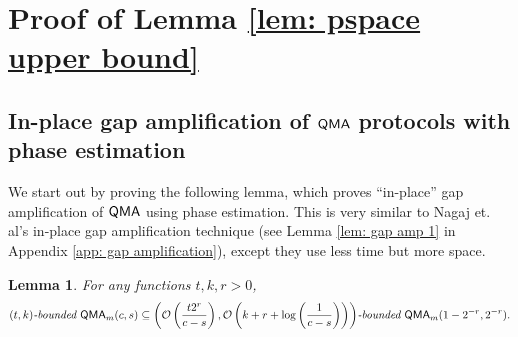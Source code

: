 \documentclass[11pt]{article}
\newtheorem{lemma}[theorem]{Lemma}
\theoremstyle{definition}
\theoremstyle{remark}
\newcommand\QMA{{\sf{QMA}}}
\newcommand\bddQMA[5]{{\left(#1,#2\right)}\textit{-bounded }\QMA_{#3}(#4,#5)}
\begin{document}
\section{Proof of Lemma \ref{lem: pspace upper bound}} \label{app: pspace upper bound}
\subsection{In-place gap amplification of $\QMA$ protocols with phase estimation}\label{app: space efficient amplification}

We start out by proving the following lemma, which proves ``in-place'' gap amplification of $\QMA$ using phase estimation.
This is very similar to Nagaj et. al's in-place gap amplification technique \cite{nwz11} (see Lemma \ref{lem: gap amp 1} in Appendix \ref{app: gap amplification}), except they use less time but more space.
\begin{lemma} \label{lem: gap amp 2}
For any functions $t,k,r>0$, 
\[
\bddQMA{t}{k}{m}{c}{s}\subseteq\bddQMA{\mathcal{O}\left(\frac{t2^r}{c-s}\right)}{\mathcal{O}\left(k+r+\log\left(\frac{1}{c-s}\right)\right)}{m}{1-2^{-r}}{2^{-r}}.
\]
\end{lemma}
\end{document}
